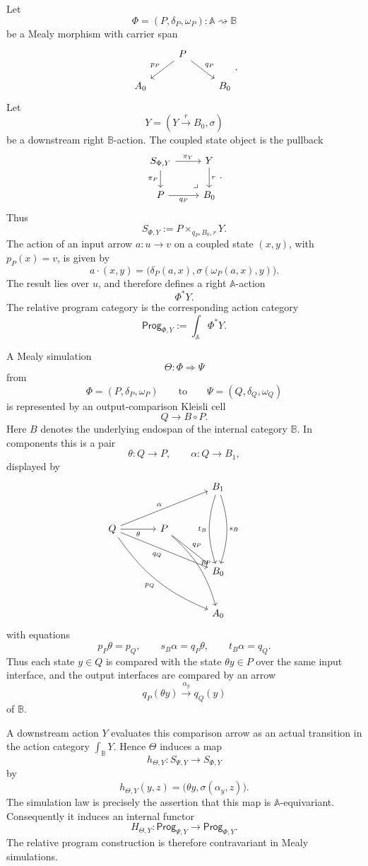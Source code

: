 Let
\[
\Phi=(P,\delta_P,\omega_P):\mathbb A\rightsquigarrow\mathbb B
\]
be a Mealy morphism with carrier span
\[
\begin{tikzcd}
& P \arrow[dl,"p_P"'] \arrow[dr,"q_P"] & \\
A_0 && B_0
\end{tikzcd}
.
\]
Let
\[
Y=(Y\xrightarrow{r}B_0,\sigma)
\]
be a downstream right \(\mathbb B\)-action. The coupled state object is the
pullback
\[
\begin{tikzcd}
S_{\Phi,Y}
\arrow[r,"\pi_Y"]
\arrow[d,"\pi_P"']
&
Y
\arrow[d,"r"]
\\
P
\arrow[r,"q_P"']
&
B_0
\arrow[ul,phantom,very near start,"\lrcorner"]
\end{tikzcd}
.
\]
Thus
\[
S_{\Phi,Y}:=P\times_{q_P,B_0,r}Y.
\]
The action of an input arrow \(a:u\to v\) on a coupled state
\((x,y)\), with \(p_P(x)=v\), is given by
\[
a\cdot(x,y)
=
\bigl(\delta_P(a,x),\sigma(\omega_P(a,x),y)\bigr).
\]
The result lies over \(u\), and therefore defines a right
\(\mathbb A\)-action
\[
\Phi^\ast Y.
\]
The relative program category is the corresponding action category
\[
\mathsf{Prog}_{\Phi,Y}
:=
\int_{\mathbb A}\Phi^\ast Y.
\]

A Mealy simulation
\[
\Theta:\Phi\Rightarrow\Psi
\]
from
\[
\Phi=(P,\delta_P,\omega_P)
\qquad\text{to}\qquad
\Psi=(Q,\delta_Q,\omega_Q)
\]
is represented by an output-comparison Kleisli cell
\[
Q\longrightarrow B\circ P.
\]
Here \(B\) denotes the underlying endospan of the internal category
\(\mathbb B\). In components this is a pair
\[
\theta:Q\to P,
\qquad
\alpha:Q\to B_1,
\]
displayed by
\[
\begin{tikzcd}[column sep=large,row sep=large]
&& B_1
  \arrow[dd,bend left=18,"s_B"]
  \arrow[dd,bend right=18,"t_B"']
&
\\
Q
  \arrow[rru,"\alpha"]
  \arrow[r,"\theta"']
  \arrow[drr,"q_Q"']
  \arrow[ddrr,bend right=16,"p_Q"']
&
P
  \arrow[dr,"q_P"]
  \arrow[rdd,bend left=16,"p_P"]
&&
\\
&& B_0 &
\\
&& A_0 &
\end{tikzcd}
\]
with equations
\[
p_P\theta=p_Q,
\qquad
s_B\alpha=q_P\theta,
\qquad
t_B\alpha=q_Q.
\]
Thus each state \(y\in Q\) is compared with the state
\(\theta y\in P\) over the same input interface, and the output interfaces
are compared by an arrow
\[
q_P(\theta y)\xrightarrow{\alpha_y}q_Q(y)
\]
of \(\mathbb B\).

A downstream action \(Y\) evaluates this comparison arrow as an actual
transition in the action category \(\int_{\mathbb B}Y\). Hence
\(\Theta\) induces a map
\[
h_{\Theta,Y}:S_{\Psi,Y}\to S_{\Phi,Y}
\]
by
\[
h_{\Theta,Y}(y,z)
=
\bigl(\theta y,\sigma(\alpha_y,z)\bigr).
\]
The simulation law is precisely the assertion that this map is
\(\mathbb A\)-equivariant. Consequently it induces an internal functor
\[
H_{\Theta,Y}:
\mathsf{Prog}_{\Psi,Y}
\longrightarrow
\mathsf{Prog}_{\Phi,Y}.
\]
The relative program construction is therefore contravariant in Mealy
simulations.

